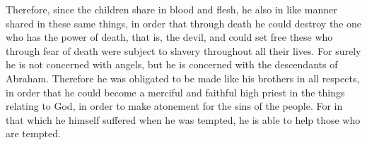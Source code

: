 \begin{biblechapter}
\verse Therefore, since the children share in blood and flesh, he also in like manner shared in these same things, in order that through death he could destroy the one who has the power of death, that is, the devil,
\verse and could set free these who through fear of death were subject to slavery throughout all their lives.
\verse For surely he is not concerned with angels, but he is concerned with the descendants of Abraham.
\verse Therefore he was obligated to be made like his brothers in all respects, in order that he could become a merciful and faithful high priest in the things relating to God, in order to make atonement for the sins of the people.
\verse For in that which he himself suffered when he was tempted, he is able to help those who are tempted.
\end{biblechapter}

